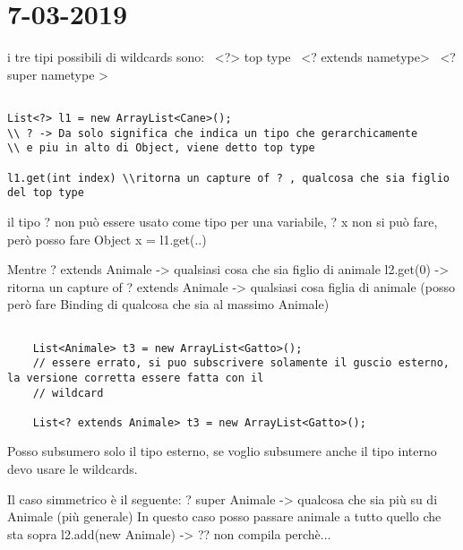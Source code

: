 

\newpage
\section{7-03-2019}

i tre tipi possibili di wildcards sono: \newline
\textbullet\ <?> top type
\textbullet\ <? extends nametype>
\textbullet\ <? super nametype >



\begin{lstlisting}[basicstyle=\small,]

List<?> l1 = new ArrayList<Cane>();
\\ ? -> Da solo significa che indica un tipo che gerarchicamente
\\ e piu in alto di Object, viene detto top type

l1.get(int index) \\ritorna un capture of ? , qualcosa che sia figlio del top type 

\end{lstlisting}

il tipo ? non può essere usato come tipo per una variabile, ? x non si può fare, però posso fare
 Object x = l1.get(..) \newline
 
Mentre ? extends Animale -> qualsiasi cosa che sia figlio di animale \newline
l2.get(0) -> ritorna un capture of ? extends Animale -> qualsiasi cosa figlia di animale (posso però fare Binding di qualcosa che sia al massimo Animale) \newline

\begin{lstlisting}[basicstyle=\small,]

	List<Animale> t3 = new ArrayList<Gatto>();
	// essere errato, si puo subscrivere solamente il guscio esterno, la versione corretta essere fatta con il 
	// wildcard
	
	List<? extends Animale> t3 = new ArrayList<Gatto>();

\end{lstlisting}

Posso subsumero solo il tipo esterno, se voglio subsumere anche il tipo interno devo usare le wildcards. \newline

Il caso simmetrico è il seguente:
? super Animale -> qualcosa che sia più su di Animale (più generale) \newline
In questo caso posso passare animale a tutto quello che sta sopra
l2.add(new Animale) -> ?? non compila perchè... \newline


